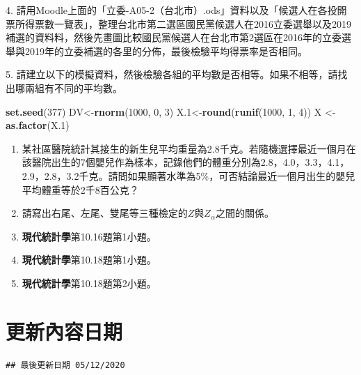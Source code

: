 \documentclass[hyperref,]{ctexart}
\newenvironment{Shaded}{\begin{snugshade}}{\end{snugshade}}
\newcommand{\DecValTok}[1]{\textcolor[rgb]{0.00,0.00,0.81}{#1}}
\newcommand{\FloatTok}[1]{\textcolor[rgb]{0.00,0.00,0.81}{#1}}
\newcommand{\KeywordTok}[1]{\textcolor[rgb]{0.13,0.29,0.53}{\textbf{#1}}}
\newcommand{\NormalTok}[1]{#1}
\newcommand{\StringTok}[1]{\textcolor[rgb]{0.31,0.60,0.02}{#1}}
\begin{document}
4.
請用Moodle上面的「立委-A05-2（台北市）.ods」資料以及「候選人在各投開票所得票數一覽表」，整理台北市第二選區國民黨候選人在2016立委選舉以及2019補選的資料料，然後先畫圖比較國民黨候選人在台北市第2選區在2016年的立委選舉與2019年的立委補選的各里的分佈，最後檢驗平均得票率是否相同。

5.
請建立以下的模擬資料，然後檢驗各組的平均數是否相等。如果不相等，請找出哪兩組有不同的平均數。

\begin{Shaded}
\begin{Highlighting}[]
\KeywordTok{set.seed}\NormalTok{(}\DecValTok{377}\NormalTok{)}
\NormalTok{DV<-}\KeywordTok{rnorm}\NormalTok{(}\DecValTok{1000}\NormalTok{, }\DecValTok{0}\NormalTok{, }\DecValTok{3}\NormalTok{)}
\NormalTok{X}\FloatTok{.1}\NormalTok{<-}\KeywordTok{round}\NormalTok{(}\KeywordTok{runif}\NormalTok{(}\DecValTok{1000}\NormalTok{, }\DecValTok{1}\NormalTok{, }\DecValTok{4}\NormalTok{))}
\NormalTok{X <-}\StringTok{ }\KeywordTok{as.factor}\NormalTok{(X}\FloatTok{.1}\NormalTok{)}
\end{Highlighting}
\end{Shaded}

\begin{enumerate}
\def\labelenumi{\arabic{enumi}.}
\setcounter{enumi}{5}
\item
  某社區醫院統計其接生的新生兒平均重量為2.8千克。若隨機選擇最近一個月在該醫院出生的7個嬰兒作為樣本，記錄他們的體重分別為2.8，4.0，3.3，4.1，2.9，2.8，3.2千克。請問如果顯著水準為5\%，可否結論最近一個月出生的嬰兒平均體重等於2千8百公克？
\item
  請寫出右尾、左尾、雙尾等三種檢定的\(Z\)與\(Z_{\alpha}\)之間的關係。
\item
  \textbf{現代統計學}第10.16題第1小題。
\item
  \textbf{現代統計學}第10.18題第1小題。
\item
  \textbf{現代統計學}第10.18題第2小題。
\end{enumerate}

\hypertarget{ux66f4ux65b0ux5167ux5bb9ux65e5ux671f}{%
\section{更新內容日期}\label{ux66f4ux65b0ux5167ux5bb9ux65e5ux671f}}

\begin{verbatim}
## 最後更新日期 05/12/2020
\end{verbatim}
\end{document}
